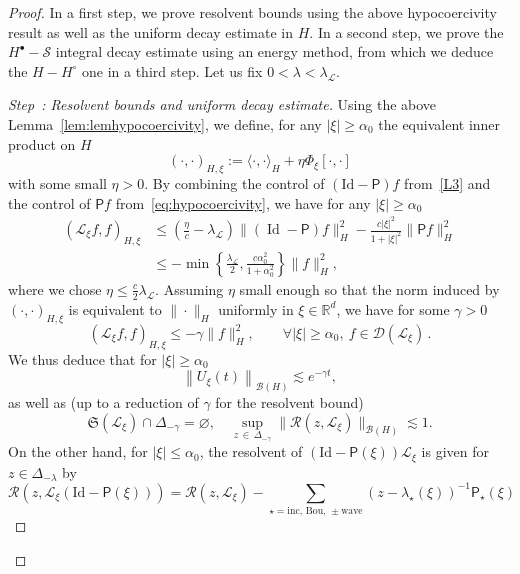 \documentclass[AHL,Unicode,longabstracts,published]{cedram}
\DeclareMathOperator{\id}{Id}
\newcommand{\Id}{\mathrm{Id}}
\newcommand{\Wave}{\mathrm{wave}}
\newcommand{\Inc}{\mathrm{inc}}
\newcommand{\Bou}{\mathrm{Bou}}
\newcommand{\R}{\mathbb{R}}
\newcommand{\fkS}{\mathfrak{S}}
\newcommand{\LL}{\mathcal{L}}
\newcommand{\PP}{\mathsf{P}}
\newcommand{\RR}{\mathcal{R}}
\renewcommand{\SS}{\mathcal{S}}
\newcommand{\dom}{\mathscr{D}}
\newcommand{\BBB}{\mathscr{B}}
\newcommand{\Ss}{H}
\newcommand{\Ssp}{H^{\bullet}}
\newcommand{\Ssm}{H^{\circ}}
\renewcommand*\le{\leqslant}
\renewcommand*\ge{\geqslant}
\newcommand{\la}{\langle}
\newcommand{\ra}{\rangle}
\newcounter{stepcount}
\newenvironment{step}[1]{\refstepcounter{stepcount}\begin{proof}[Step~\thestepcount: #1]}{\let\qed\relax\end{proof}}
\let\oldforall\forall
\renewcommand*{\forall}{\mathrel{\oldforall}}
\begin{document}
\begin{proof}
In a first step, we prove resolvent bounds using the above hypocoercivity result as well as the uniform decay estimate in $\Ss$. In a second step, we prove the $\Ssp-\SS$ integral decay estimate using an energy method, from which we deduce the $\Ss-\Ssm$ one in a third step. Let us fix $0<\lambda < \lambda_\LL$.

\setcounter{stepcount}{0}
\begin{step}{{Resolvent bounds and uniform decay estimate}}
Using the above Lemma~\ref{lem:lemhypocoercivity}, we define, for any $|\xi| \ge \alpha_{0}$ the equivalent inner product on $\Ss$
\[
(\cdot, \cdot)_{\Ss, \xi} := \la \cdot, \cdot \ra_{\Ss} + \eta \Phi_\xi[\cdot, \cdot]
\]
with some small $\eta > 0$. By combining the control of $(\Id - \PP)f$ from~\eqref{L3} and the control of $\PP f$ from~\eqref{eq:hypocoercivity}, we have for any $| \xi | \ge \alpha_0$
\begin{align*}
\left(\LL_\xi f, f \right)_{\Ss, \xi} & \le \left(\frac{\eta}{c} - \lambda_\LL\right) \| (\id - \PP) f \|_{\Ss}^2 - \frac{c |\xi|^2}{1 + |\xi| ^2} \| \PP f \|^2_{\Ss} \\
& \le -\min\left\{ \frac{\lambda_\LL}{2}, \frac{c \alpha_{0} ^2 }{1 + \alpha_{0} ^2} \right\} \| f \|^2_{\Ss},
\end{align*}
where we chose $\eta \le \frac{c}{2} \lambda_\LL$. Assuming $\eta$ small enough so that the norm induced by~$(\cdot, \cdot)_{\Ss, \xi}$ is equivalent to $\| \cdot \|_{\Ss}$ uniformly in $\xi \in \R^d$, we have for some $\gamma > 0$
\begin{equation*}
\left(\LL_\xi f, f\right)_{\Ss, \xi} \le -\gamma \| f \|_{\Ss}^2, \qquad
\forall | \xi | \ge \alpha_0,~f \in \dom(\LL_{\xi})\,.
\end{equation*}
We thus deduce that for $| \xi | \ge \alpha_{0}$
\begin{equation*}
\left\| U_{\xi}(t) \right\|_{\BBB(\Ss)} \lesssim e^{-\gamma t},
\end{equation*}
as well as (up to a reduction of $\gamma$ for the resolvent bound)
\begin{equation*}
\fkS(\LL_{\xi}) \cap \Delta_{-\gamma} = \varnothing, \quad \sup_{z\,\in\,\Delta_{-\gamma}} \| \RR(z,\LL_{\xi}) \|_{\BBB(\Ss)} \lesssim 1.
\end{equation*}
On the other hand, for $|\xi| \le \alpha_{0}$, the resolvent of $(\Id - \PP(\xi)) \LL_\xi$ is given for $z \in \Delta_{-\lambda}$ by
\[
\RR(z,\LL_{\xi}(\Id-\PP(\xi)))=\RR(z,\LL_{\xi}) - \sum_{\star = \Inc,\,\Bou,\,\pm \Wave}(z-\lambda_{\star}(\xi))^{-1} \PP_\star(\xi)
\]
\end{step}
\end{proof}
\end{document}

